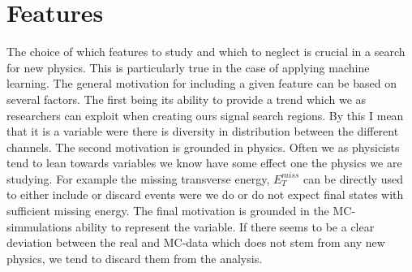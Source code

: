 \section{Features}
The choice of which features to study and which to neglect is crucial in a search for new physics. This is particularly true 
in the case of applying machine learning. The general motivation for including a given feature can be based on several factors. 
The first being its ability to provide a trend which we as researchers can exploit when creating ours signal search regions. By this I mean
that it is a variable were there is diversity in distribution between the different channels. The second motivation is grounded in 
physics. Often we as physicists tend to lean towards variables we know have some effect one the physics we are studying. For 
example the missing transverse energy, $E_T^{miss}$ can be directly used to either include or discard events were we do or do not expect final states
with sufficient missing energy. The final motivation is grounded in the \ac{MC}-simmulations ability to represent the variable.
If there seems to be a clear deviation between the real and \ac{MC}-data which does not stem from any new physics, we tend to discard
them from the analysis.